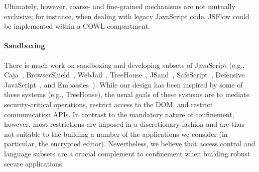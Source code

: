 Ultimately, however, coarse- and fine-grained mechanisms are not mutually
exclusive; for instance, when dealing with legacy JavaScript code, JSFlow could be
implemented within a COWL compartment.

\paragraph{Sandboxing}
There is much work on sandboxing and developing subsets of JavaScript (e.g.,
Caja~\cite{GoogleCaja}, BrowserShield~\cite{Reis:2007},
WebJail~\cite{VanAcker:2011}, TreeHouse~\cite{Ingram:2012},
JSand~\cite{Agten:2012:JCC}, SafeScript~\cite{SafeScript}, Defensive
JavaScript~\cite{djs}, and Embassies~\cite{Howell:2013}). 
%
While our design has been inspired by some of these systems (e.g.,
TreeHouse), the usual goals of these systems are to mediate
security-critical operations, restrict access to the DOM, and restrict
communication APIs\@.
%
In contrast to the mandatory nature of confinement, however, most restrictions
are imposed in a discretionary fashion and are thus not suitable to the
building a number of the applications we consider (in particular, the encrypted
editor).
%
Nevertheless, we believe that access control and language subsets are a crucial
complement to confinement when building robust secure applications.

